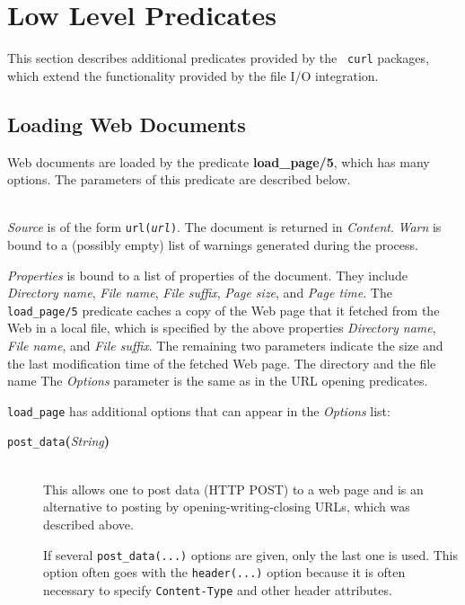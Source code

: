 \section{Low Level Predicates}

This section describes additional predicates provided by the {\tt
  curl} packages, which extend the functionality provided by the file I/O
integration.

\subsection{Loading Web Documents}

Web documents are loaded by the predicate {\bf load\_page/5}, which has
many options. The parameters of this predicate are described below.


\begin{description}
\item[load\_page({\it +Source, +Options, -Properties, -Content, -Warn})]\mbox{}
  \\
  {\it Source} is of the form {\tt url({\it {url}})}.
  The document is returned in {\it Content}.
  {\it Warn} is bound to a (possibly empty) list of warnings generated during the process.

  {\it Properties} is bound to a list of properties of the document. They
  include {\it Directory name}, {\it File name}, {\it File suffix}, {\it
    Page size}, and {\it Page time}.
  The {\tt load\_page/5}  predicate caches a copy of the Web page that it
  fetched from the Web in a local file, which is specified by the above
  properties \emph{Directory name}, \emph{File name}, and \emph{File
    suffix}. The remaining two parameters indicate the size and the last
  modification time of the fetched Web page.
  The directory and the file name 
  The \emph{Options} parameter is the same as in the URL opening
  predicates. 

  \texttt{load\_page} has additional options that can appear in the
  \emph{Options} list:
  \begin{description}
  \item[{\tt post\_data}{\bf (}{\it String}{\bf )}]\mbox{}\\
    This allows one to post data (HTTP POST)
    to a web page and is an alternative to
    posting by opening-writing-closing URLs, which was described above.

    If several \texttt{post\_data(...)} options are given, only the last one is
    used. This option often goes with the \texttt{header(...)} option because it
    is often necessary to specify \texttt{Content-Type} and other header
    attributes.  


\end{description}
\end{description}
